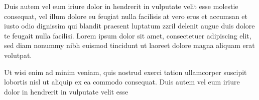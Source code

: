 Duis autem vel eum iriure dolor in hendrerit in vulputate velit esse molestie consequat, vel illum dolore eu feugiat nulla facilisis at vero eros et accumsan et iusto odio dignissim qui blandit praesent luptatum zzril delenit augue duis dolore te feugait nulla facilisi. Lorem ipsum dolor sit amet, consectetuer adipiscing elit, sed diam nonummy nibh euismod tincidunt ut laoreet dolore magna aliquam erat volutpat.   

Ut wisi enim ad minim veniam, quis nostrud exerci tation ullamcorper suscipit lobortis nisl ut aliquip ex ea commodo consequat. Duis autem vel eum iriure dolor in hendrerit in vulputate velit esse

